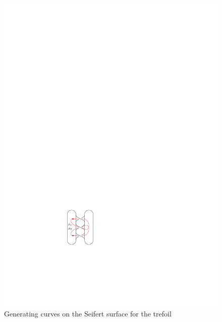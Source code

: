 \begin{example}
\begin{figure}
\centering
\includegraphics{"graphics/left-trefoil-seifert-algorithm"}
\caption{Generating curves on the Seifert surface for the trefoil}
\label{left-trefoil-seifert-algorithm}
\end{figure}
\end{example}


